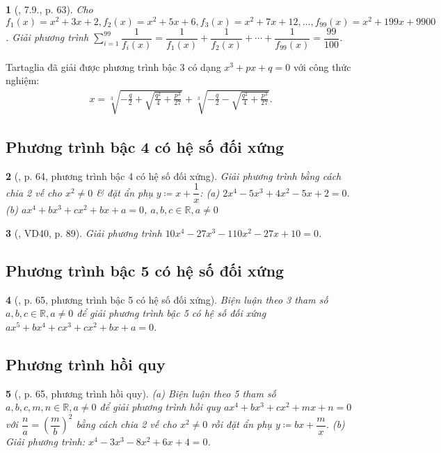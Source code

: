\documentclass{article}
\newtheorem{baitoan}{}
\begin{document}
\begin{baitoan}[\cite{Binh_boi_duong_Toan_9_tap_2}, 7.9., p. 63]
	Cho $f_1(x) = x^2 + 3x + 2,f_2(x) = x^2 + 5x + 6,f_3(x) = x^2 + 7x + 12,\ldots,f_{99}(x) = x^2 + 199x + 9900$. Giải phương trình $\sum_{i=1}^{99} \dfrac{1}{f_i(x)} = \dfrac{1}{f_1(x)} + \dfrac{1}{f_2(x)} + \cdots + \dfrac{1}{f_{99}(x)} = \dfrac{99}{100}$.
\end{baitoan}
Tartaglia đã giải được phương trình bậc 3 có dạng $x^3 + px + q = 0$ với công thức nghiệm:
\begin{align*}
	x = \sqrt[3]{-\frac{q}{2} + \sqrt{\frac{q^2}{4} + \frac{p^3}{27}}} + \sqrt[3]{-\frac{q}{2} - \sqrt{\frac{q^2}{4} + \frac{p^3}{27}}}.
\end{align*}

\subsection{Phương trình bậc 4 có hệ số đối xứng}

\begin{baitoan}[\cite{Binh_boi_duong_Toan_9_tap_2}, p. 64, phương trình bậc 4 có hệ số đối xứng]
	Giải phương trình bằng cách chia 2 vế cho $x^2\ne0$ \& đặt ẩn phụ $y\coloneqq x + \dfrac{1}{x}$: (a) $2x^4 - 5x^3 + 4x^2 - 5x + 2 = 0$. (b) $ax^4 + bx^3 + cx^2 + bx + a = 0$, $a,b,c\in\mathbb{R},a\ne0$
\end{baitoan}

\begin{baitoan}[\cite{Tuyen_Toan_9_old}, VD40, p. 89]
	Giải phương trình $10x^4 - 27x^3 - 110x^2 - 27x + 10 = 0$.
\end{baitoan}

\subsection{Phương trình bậc 5 có hệ số đối xứng}

\begin{baitoan}[\cite{Binh_boi_duong_Toan_9_tap_2}, p. 65, phương trình bậc 5 có hệ số đối xứng]
	Biện luận theo 3 tham số $a,b,c\in\mathbb{R},a\ne0$ để giải phương trình bậc 5 có hệ số đối xứng $ax^5 + bx^4 + cx^3 + cx^2 + bx + a = 0$.
\end{baitoan}

\subsection{Phương trình hồi quy}

\begin{baitoan}[\cite{Binh_boi_duong_Toan_9_tap_2}, p. 65, phương trình hồi quy]
	(a) Biện luận theo 5 tham số $a,b,c,m,n\in\mathbb{R},a\ne0$ để giải phương trình hồi quy $ax^4 + bx^3 + cx^2 + mx + n = 0$ với $\dfrac{n}{a} = \left(\dfrac{m}{b}\right)^2$ bằng cách chia 2 vế cho $x^2\ne0$ rồi đặt ẩn phụ $y\coloneqq bx + \dfrac{m}{x}$. (b) Giải phương trình: $x^4 - 3x^3 - 8x^2 + 6x + 4 = 0$.
\end{baitoan}
\end{document}
